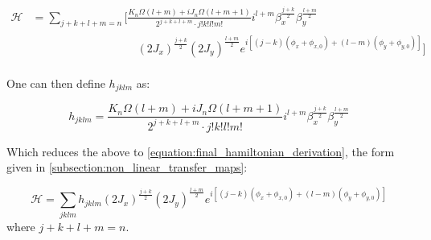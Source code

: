 \begin{equation}
    \begin{aligned}
        \mathcal{H} &= \sum_{j + k + l + m= n} \biggl[ \frac{K_n \Omega(l+m) + i J_n \Omega(l+m+1)}{2^{j+k+l+m} \cdot j! k! l! m!} i^{l+m} \beta_x^{\frac{j+k}{2}} \beta_y^{\frac{l+m}{2}} \\
                    & \begin{aligned}
                        \phantom{\biggl[ \sum_{j + k + l + m = n} \quad}
                    & (2 J_x)^{\frac{j+k}{2}} (2 J_y)^{\frac{l+m}{2}} e^{i \left[ (j-k) (\phi_x + \phi_{x,0}) + (l-m) (\phi_y + \phi_{y,0}) \right]}
                                \biggr]
                        \end{aligned}
    \end{aligned}
    \label{equation:hamiltonian_multinomial_expanded}
\end{equation}

One can then define \(h_{jklm}\) as:

\begin{equation}
    h_{jklm} = \frac{K_n \Omega(l+m) + i J_n \Omega(l+m+1)} {2^{j+k+l+m} \cdot j! k! l! m!} i^{l+m} \beta_x^{\frac{j+k}{2}} \beta_y^{\frac{l+m}{2}}
\end{equation}

Which reduces the above to \cref{equation:final_hamiltonian_derivation}, the form given in \cref{subsection:non_linear_transfer_maps}:

\begin{equation}
    \mathcal{H} = \sum_{jklm} h_{jklm} (2 J_x)^{\frac{j+k}{2}} (2J_y)^{\frac{l+m}{2}} e^{i\left[ (j-k)(\phi_x + \phi_{x,0}) + (l-m)(\phi_y + \phi_{y,0}) \right]}
    \label{equation:final_hamiltonian_derivation}
\end{equation}
where \(j+k+l+m=n\).


